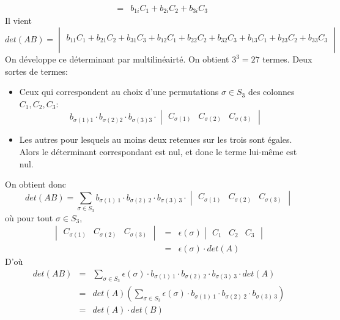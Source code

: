 {\begin{eqnarray*}
      &=& b_{1i} C_1 + b_{2i} C_2 + b_{3i} C_3
  \end{eqnarray*}
  Il vient
  $$det(A B) = \begin{vmatrix} \\ b_{11} C_1 + b_{21} C_2 + b_{31} C_3 + b_{12} C_1 + b_{22} C_2 + b_{32} C_3 + b_{13} C_1 + b_{23} C_2 + b_{33} C_3 \\ \\ \end{vmatrix}$$
  On développe ce déterminant par multilinéairté. On obtient $3^3 = 27$ termes. Deux sortes de termes:
  \begin{itemize}
    \item Ceux qui correspondent au choix d'une permutations $\sigma \in S_3$ des colonnes $C_1, C_2, C_3$:
      $$b_{\sigma(1) 1} \cdot b_{\sigma(2) 2} \cdot b_{\sigma(3) 3} \cdot \begin{vmatrix} C_{\sigma(1)} & C_{\sigma(2)} & C_{\sigma(3)} \end{vmatrix}$$
      
    \item Les autres pour lesquels au moins deux retenues sur les trois sont égales. Alors le déterminant correspondant est nul, et donc le terme lui-même est nul.
  \end{itemize}
  On obtient donc
  $$det(A B) = \sum_{\sigma \in S_3} b_{\sigma(1) ~ 1} \cdot b_{\sigma(2) ~ 2} \cdot b_{\sigma(3) ~ 3} \cdot \begin{vmatrix} C_{\sigma(1)} & C_{\sigma(2)} & C_{\sigma(3)} \end{vmatrix}$$
  où pour tout $\sigma \in S_3$,
  \begin{eqnarray*}
    \begin{vmatrix} C_{\sigma(1)} & C_{\sigma(2)} & C_{\sigma(3)} \end{vmatrix}
    &=& \epsilon(\sigma) \begin{vmatrix} C_1 & C_2 & C_ 3 \end{vmatrix} \\
      &=& \epsilon(\sigma) \cdot det(A)
  \end{eqnarray*}
  D'où
  \begin{eqnarray*}
    det(A B) &=& \sum_{\sigma \in S_3} \epsilon(\sigma) \cdot b_{\sigma(1) ~ 1} \cdot b_{\sigma(2) ~ 2} \cdot b_{\sigma(3) ~ 3} \cdot det(A) \\
      &=& det(A) \left( \sum_{\sigma \in S_3} \epsilon(\sigma) \cdot b_{\sigma(1) ~ 1} \cdot b_{\sigma(2) ~ 2} \cdot b_{\sigma(3) ~ 3} \right) \\
      &=& det(A) \cdot det(B)
  \end{eqnarray*}
}

